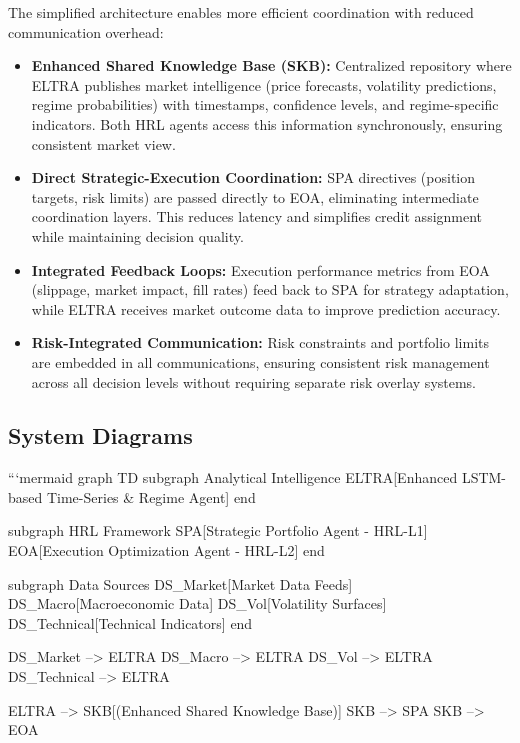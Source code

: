 \documentclass[11pt,a4paper]{article}
\begin{document}
The simplified architecture enables more efficient coordination with reduced communication overhead:

\begin{itemize}
\item   \textbf{Enhanced Shared Knowledge Base (SKB):} Centralized repository where ELTRA publishes market intelligence (price forecasts, volatility predictions, regime probabilities) with timestamps, confidence levels, and regime-specific indicators. Both HRL agents access this information synchronously, ensuring consistent market view.
\item   \textbf{Direct Strategic-Execution Coordination:} SPA directives (position targets, risk limits) are passed directly to EOA, eliminating intermediate coordination layers. This reduces latency and simplifies credit assignment while maintaining decision quality.
\item   \textbf{Integrated Feedback Loops:} Execution performance metrics from EOA (slippage, market impact, fill rates) feed back to SPA for strategy adaptation, while ELTRA receives market outcome data to improve prediction accuracy.
\item   \textbf{Risk-Integrated Communication:} Risk constraints and portfolio limits are embedded in all communications, ensuring consistent risk management across all decision levels without requiring separate risk overlay systems.

\end{itemize}
\subsection{System Diagrams}

```mermaid
graph TD
    subgraph Analytical Intelligence
        ELTRA[Enhanced LSTM-based Time-Series \& Regime Agent]
    end

    subgraph HRL Framework
        SPA[Strategic Portfolio Agent - HRL-L1]
        EOA[Execution Optimization Agent - HRL-L2]
    end

    subgraph Data Sources
        DS\_Market[Market Data Feeds]
        DS\_Macro[Macroeconomic Data]
        DS\_Vol[Volatility Surfaces]
        DS\_Technical[Technical Indicators]
    end

    DS\_Market --> ELTRA
    DS\_Macro --> ELTRA
    DS\_Vol --> ELTRA
    DS\_Technical --> ELTRA

    ELTRA --> SKB[(Enhanced Shared Knowledge Base)]
    SKB --> SPA
    SKB --> EOA
    
\end{document}
